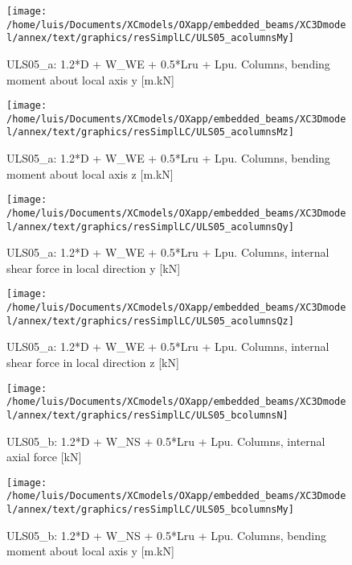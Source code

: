 \begin{figure}
\begin{center}
\texttt{[image: /home/luis/Documents/XCmodels/OXapp/embedded\_beams/XC3Dmodel/annex/text/graphics/resSimplLC/ULS05\_acolumnsMy]}
\caption{ULS05_a: 1.2*D + W_WE + 0.5*Lru + Lpu. Columns, bending moment about local axis y [m.kN]}
\end{center}
\end{figure}
\begin{figure}
\begin{center}
\texttt{[image: /home/luis/Documents/XCmodels/OXapp/embedded\_beams/XC3Dmodel/annex/text/graphics/resSimplLC/ULS05\_acolumnsMz]}
\caption{ULS05_a: 1.2*D + W_WE + 0.5*Lru + Lpu. Columns, bending moment about local axis z [m.kN]}
\end{center}
\end{figure}
\begin{figure}
\begin{center}
\texttt{[image: /home/luis/Documents/XCmodels/OXapp/embedded\_beams/XC3Dmodel/annex/text/graphics/resSimplLC/ULS05\_acolumnsQy]}
\caption{ULS05_a: 1.2*D + W_WE + 0.5*Lru + Lpu. Columns, internal shear force in local direction y [kN]}
\end{center}
\end{figure}
\begin{figure}
\begin{center}
\texttt{[image: /home/luis/Documents/XCmodels/OXapp/embedded\_beams/XC3Dmodel/annex/text/graphics/resSimplLC/ULS05\_acolumnsQz]}
\caption{ULS05_a: 1.2*D + W_WE + 0.5*Lru + Lpu. Columns, internal shear force in local direction z [kN]}
\end{center}
\end{figure}
\clearpage
\begin{figure}
\begin{center}
\texttt{[image: /home/luis/Documents/XCmodels/OXapp/embedded\_beams/XC3Dmodel/annex/text/graphics/resSimplLC/ULS05\_bcolumnsN]}
\caption{ULS05_b: 1.2*D + W_NS + 0.5*Lru + Lpu. Columns, internal axial force [kN]}
\end{center}
\end{figure}
\begin{figure}
\begin{center}
\texttt{[image: /home/luis/Documents/XCmodels/OXapp/embedded\_beams/XC3Dmodel/annex/text/graphics/resSimplLC/ULS05\_bcolumnsMy]}
\caption{ULS05_b: 1.2*D + W_NS + 0.5*Lru + Lpu. Columns, bending moment about local axis y [m.kN]}
\end{center}
\end{figure}
